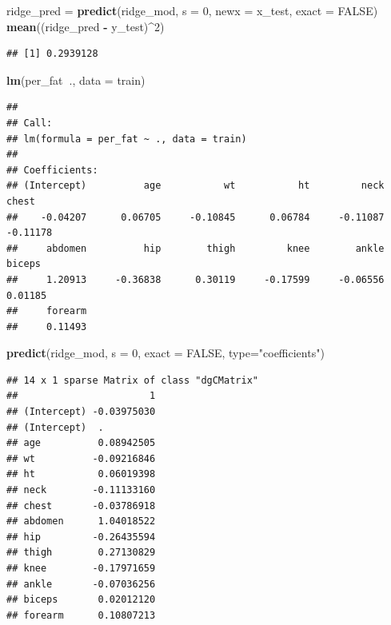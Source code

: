 \documentclass[]{article}
\newenvironment{Shaded}{\begin{snugshade}}{\end{snugshade}}
\newcommand{\KeywordTok}[1]{\textcolor[rgb]{0.13,0.29,0.53}{\textbf{#1}}}
\newcommand{\DataTypeTok}[1]{\textcolor[rgb]{0.13,0.29,0.53}{#1}}
\newcommand{\DecValTok}[1]{\textcolor[rgb]{0.00,0.00,0.81}{#1}}
\newcommand{\StringTok}[1]{\textcolor[rgb]{0.31,0.60,0.02}{#1}}
\newcommand{\OtherTok}[1]{\textcolor[rgb]{0.56,0.35,0.01}{#1}}
\newcommand{\OperatorTok}[1]{\textcolor[rgb]{0.81,0.36,0.00}{\textbf{#1}}}
\newcommand{\NormalTok}[1]{#1}
\begin{document}
\begin{Shaded}
\begin{Highlighting}[]
\NormalTok{ridge_pred =}\StringTok{ }\KeywordTok{predict}\NormalTok{(ridge_mod, }\DataTypeTok{s =} \DecValTok{0}\NormalTok{, }\DataTypeTok{newx =}\NormalTok{ x_test, }\DataTypeTok{exact =} \OtherTok{FALSE}\NormalTok{)}
\KeywordTok{mean}\NormalTok{((ridge_pred }\OperatorTok{-}\StringTok{ }\NormalTok{y_test)}\OperatorTok{^}\DecValTok{2}\NormalTok{)}
\end{Highlighting}
\end{Shaded}

\begin{verbatim}
## [1] 0.2939128
\end{verbatim}

\begin{Shaded}
\begin{Highlighting}[]
\KeywordTok{lm}\NormalTok{(per_fat}\OperatorTok{~}\NormalTok{., }\DataTypeTok{data =}\NormalTok{ train)}
\end{Highlighting}
\end{Shaded}

\begin{verbatim}
## 
## Call:
## lm(formula = per_fat ~ ., data = train)
## 
## Coefficients:
## (Intercept)          age           wt           ht         neck        chest  
##    -0.04207      0.06705     -0.10845      0.06784     -0.11087     -0.11178  
##     abdomen          hip        thigh         knee        ankle       biceps  
##     1.20913     -0.36838      0.30119     -0.17599     -0.06556      0.01185  
##     forearm  
##     0.11493
\end{verbatim}

\begin{Shaded}
\begin{Highlighting}[]
\KeywordTok{predict}\NormalTok{(ridge_mod, }\DataTypeTok{s =} \DecValTok{0}\NormalTok{, }\DataTypeTok{exact =} \OtherTok{FALSE}\NormalTok{, }\DataTypeTok{type=}\StringTok{"coefficients"}\NormalTok{)}
\end{Highlighting}
\end{Shaded}

\begin{verbatim}
## 14 x 1 sparse Matrix of class "dgCMatrix"
##                       1
## (Intercept) -0.03975030
## (Intercept)  .         
## age          0.08942505
## wt          -0.09216846
## ht           0.06019398
## neck        -0.11133160
## chest       -0.03786918
## abdomen      1.04018522
## hip         -0.26435594
## thigh        0.27130829
## knee        -0.17971659
## ankle       -0.07036256
## biceps       0.02012120
## forearm      0.10807213
\end{verbatim}
\end{document}
